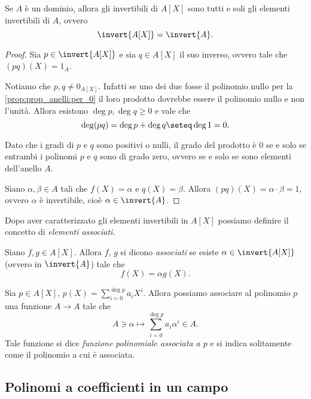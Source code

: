 \begin{corollary}
    Se $A$ è un dominio, allora gli invertibili di $A[X]$ sono tutti e soli gli elementi invertibili di $A$, ovvero \[
        \invert{A[X]} = \invert{A}. 
    \]
\end{corollary}
\begin{proof}
    Sia $p \in \invert{A[X]}$ e sia $q \in A[X]$ il suo inverso, ovvero tale che $(pq)(X) = 1_A$.

    Notiamo che $p, q \neq 0_{A[X]}$. Infatti se uno dei due fosse il polinomio nullo per la \autoref{prop:prop_anelli:per_0} il loro prodotto dovrebbe essere il polinomio nullo e non l'unità. Allora esistono $\deg p, \deg q \geq 0$ e vale che \[
        \deg (pq) = \deg p + \deg q \seteq \deg 1 = 0.    
    \]

    Dato che i gradi di $p$ e $q$ sono positivi o nulli, il grado del prodotto è $0$ se e solo se entrambi i polinomi $p$ e $q$ sono di grado zero, ovvero se e solo se sono elementi dell'anello $A$.

    Siano $\alpha, \beta \in A$ tali che $f(X) = \alpha$ e $q(X) = \beta$. Allora $(pq)(X) = \alpha \cdot \beta = 1$, ovvero $\alpha$ è invertibile, cioè $\alpha \in \invert{A}$.
\end{proof}

Dopo aver caratterizzato gli elementi invertibili in $A[X]$ possiamo definire il concetto di \emph{elementi associati}.

\begin{definition}
    Siano $f, g \in A[X]$. Allora $f$, $g$ si dicono \emph{associati} se esiste $\alpha \in \invert{A[X]}$ (ovvero in $\invert{A}$) tale che \[
        f(X) = \alpha g(X).    
    \]
\end{definition}

\begin{definition}
    Sia $p \in A[X]$, $p(X) = \sum_{i = 0}^{\deg p} a_iX^i$. Allora possiamo associare al polinomio $p$ una funzione $A \to A$ tale che \begin{equation}
        A \ni \alpha \mapsto \sum_{i = 0}^{\deg p} a_i{\alpha}^i \in A.
    \end{equation} Tale funzione si dice \emph{funzione polinomiale associata a $p$} e si indica solitamente come il polinomio a cui è associata.
\end{definition}

\subsection{Polinomi a coefficienti in un campo}

